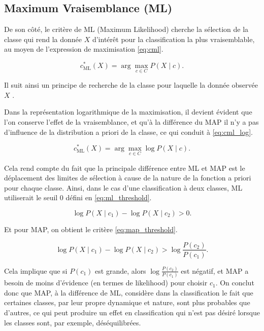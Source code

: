 \subsection{Maximum Vraisemblance (ML)}
De son côté, le critère de ML (Maximum Likelihood) cherche la sélection de la classe qui rend la donnée \(X\) d’intérêt pour la classification la plus vraisemblable, au moyen de l’expression de maximisation \eqref{eq:cml}.

\begin{equation}
\label{eq:cml}
c_{\mathrm{ML}}^{\ast}(X)=\arg\max_{c\in C} P(X\mid c).
\end{equation}

Il suit ainsi un principe de recherche de la classe pour laquelle la donnée observée \(X\) \cite{yuille_bayes_decision_theory}.

Dans la représentation logarithmique de la maximisation, il devient évident que l’on conserve l’effet de la vraisemblance, et qu’à la différence du MAP il n’y a pas d’influence de la distribution a priori de la classe, ce qui conduit à \eqref{eq:cml_log}.

\begin{equation}
\label{eq:cml_log}
c_{\mathrm{ML}}^{\ast}(X)=\arg\max_{c\in C}\log P(X\mid c).
\end{equation}

Cela rend compte du fait que la principale différence entre ML et MAP est le déplacement des limites de sélection à cause de la nature de la fonction a priori pour chaque classe. Ainsi, dans le cas d’une classification à deux classes, ML utiliserait le seuil \(0\) défini en \eqref{eq:ml_threshold}.

\begin{equation}
\label{eq:ml_threshold}
\log P(X\mid c_1)-\log P(X\mid c_2) > 0.
\end{equation}

Et pour MAP, on obtient le critère \eqref{eq:map_threshold}.

\begin{equation}
\label{eq:map_threshold}
\log P(X\mid c_1)-\log P(X\mid c_2) > \log\frac{P(c_2)}{P(c_1)}.
\end{equation}

Cela implique que si \(P(c_1)\) est grande, alors \(\log\frac{P(c_2)}{P(c_1)}\) est négatif, et MAP a besoin de moins d’évidence (en termes de likelihood) pour choisir \(c_1\). On conclut donc que MAP, à la différence de ML, considère dans la classification le fait que certaines classes, par leur propre dynamique et nature, sont plus probables que d’autres, ce qui peut produire un effet en classification qui n’est pas désiré lorsque les classes sont, par exemple, déséquilibrées.



